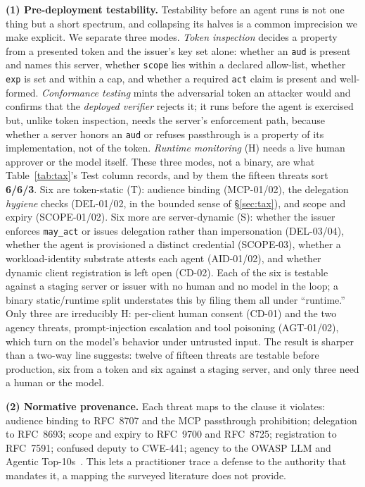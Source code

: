 \noindent\textbf{(1) Pre-deployment testability.} Testability before an agent runs is
not one thing but a short spectrum, and collapsing its halves is a common imprecision
we make explicit. We separate three modes. \emph{Token inspection} decides a property
from a presented token and the issuer's key set alone: whether an \texttt{aud} is
present and names this server, whether \texttt{scope} lies within a declared
allow-list, whether \texttt{exp} is set and within a cap, and whether a required
\texttt{act} claim is present and well-formed. \emph{Conformance testing} mints the
adversarial token an attacker would and confirms that the \emph{deployed verifier}
rejects it; it runs before the agent is exercised but, unlike token inspection, needs
the server's enforcement path, because whether a server honors an \texttt{aud} or
refuses passthrough is a property of its implementation, not of the token.
\emph{Runtime monitoring} (\textsf{H}) needs a live human approver or the model
itself. These three modes, not a binary, are what Table~\ref{tab:tax}'s Test column
records, and by them the fifteen threats sort \textbf{6/6/3}. Six are token-static
(\textsf{T}): audience binding (MCP-01/02), the delegation \emph{hygiene} checks
(DEL-01/02, in the bounded sense of \S\ref{sec:tax}), and scope and expiry
(SCOPE-01/02). Six more are server-dynamic (\textsf{S}): whether the issuer enforces
\texttt{may\_act} or issues delegation rather than impersonation (DEL-03/04), whether
the agent is provisioned a distinct credential (SCOPE-03), whether a workload-identity
substrate attests each agent (AID-01/02), and whether dynamic client registration is
left open (CD-02). Each of the six is testable against a staging server or issuer with
no human and no model in the loop; a binary static/runtime split understates this by
filing them all under ``runtime.'' Only three are irreducibly \textsf{H}: per-client
human consent (CD-01) and the two agency threats, prompt-injection escalation and tool
poisoning (AGT-01/02), which turn on the model's behavior under untrusted input. The
result is sharper than a two-way line suggests: twelve of fifteen threats are testable
before production, six from a token and six against a staging server, and only three
need a human or the model.

\noindent\textbf{(2) Normative provenance.} Each threat maps to the clause it
violates: audience binding to RFC~8707 and the MCP passthrough prohibition;
delegation to RFC~8693; scope and expiry to RFC~9700 and RFC~8725; registration to
RFC~7591; confused deputy to CWE-441; agency to the OWASP LLM and Agentic
Top-10s~\cite{owaspllm,owaspagentic}. This lets a practitioner trace a defense to the
authority that mandates it, a mapping the surveyed literature does not provide.

